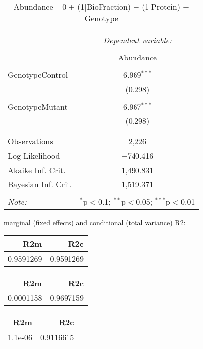 \documentclass[11pt]{report}
\begin{document}
\begin{table}[!htbp] \centering 
  \caption{Abundance ~ 0 + (1|BioFraction) + (1|Protein) + Genotype} 
  \label{} 
\begin{tabular}{@{\extracolsep{5pt}}lc} 
\\[-1.8ex]\hline 
\hline \\[-1.8ex] 
 & \multicolumn{1}{c}{\textit{Dependent variable:}} \\ 
\cline{2-2} 
\\[-1.8ex] & Abundance \\ 
\hline \\[-1.8ex] 
 GenotypeControl & 6.969$^{***}$ \\ 
  & (0.298) \\ 
  & \\ 
 GenotypeMutant & 6.967$^{***}$ \\ 
  & (0.298) \\ 
  & \\ 
\hline \\[-1.8ex] 
Observations & 2,226 \\ 
Log Likelihood & $-$740.416 \\ 
Akaike Inf. Crit. & 1,490.831 \\ 
Bayesian Inf. Crit. & 1,519.371 \\ 
\hline 
\hline \\[-1.8ex] 
\textit{Note:}  & \multicolumn{1}{r}{$^{*}$p$<$0.1; $^{**}$p$<$0.05; $^{***}$p$<$0.01} \\ 
\end{tabular} 
\end{table} 
marginal (fixed effects) and conditional (total variance) R2:

\begin{tabular}{r|r}
\hline
R2m & R2c\\
\hline
0.9591269 & 0.9591269\\
\hline
\end{tabular}

\begin{tabular}{r|r}
\hline
R2m & R2c\\
\hline
0.0001158 & 0.9697159\\
\hline
\end{tabular}

\begin{tabular}{r|r}
\hline
R2m & R2c\\
\hline
1.1e-06 & 0.9116615\\
\hline
\end{tabular}
\end{document}
